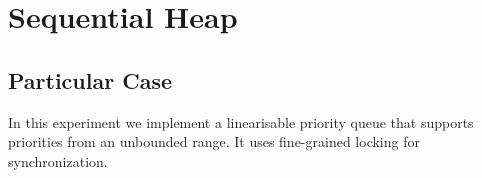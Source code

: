 


\section{\textbf{Sequential Heap}}



\subsection{Particular Case}
\par
In this experiment we implement a linearisable priority queue that supports priorities from an unbounded range. It uses fine-grained locking for synchronization.
\par



